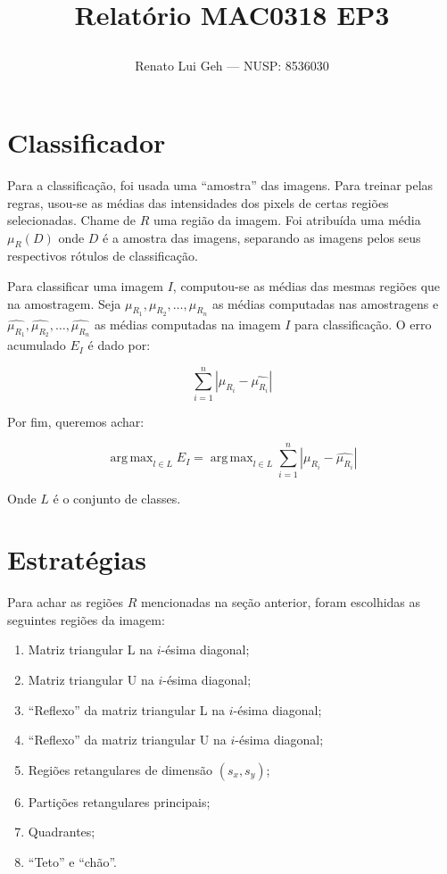 \documentclass[12pt]{article}
\title{%
  Relatório MAC0318 EP3\\
  \author{Renato Lui Geh --- NUSP\@: 8536030}
}
\date{}
\DeclareMathOperator*{\argmax}{arg\,max}
\theoremstyle{plain}
\numberwithin{equation}{section}
\begin{document}
\maketitle

\section{Classificador}

Para a classificação, foi usada uma ``amostra'' das imagens. Para treinar pelas regras, usou-se as
médias das intensidades dos pixels de certas regiões selecionadas. Chame de $R$ uma região da
imagem. Foi atribuída uma média $\mu_R(D)$ onde $D$ é a amostra das imagens, separando as imagens
pelos seus respectivos rótulos de classificação.

Para classificar uma imagem $I$, computou-se as médias das mesmas regiões que na amostragem.
Seja $\mu_{R_1},\mu_{R_2},\ldots,\mu_{R_n}$ as médias computadas nas amostragens e
$\hat{\mu_{R_1}},\hat{\mu_{R_2}},\ldots,\hat{\mu_{R_n}}$ as médias computadas na imagem $I$ para
classificação. O erro acumulado $E_I$ é dado por:

\begin{equation*}
  \sum_{i=1}^n |\mu_{R_i}-\hat{\mu_{R_i}}|
\end{equation*}

Por fim, queremos achar:

\begin{equation*}
  \argmax_{l\in L} E_I = \argmax_{l\in L} \sum_{i=1}^n |\mu_{R_i}-\hat{\mu_{R_i}}|
\end{equation*}

Onde $L$ é o conjunto de classes.

\section{Estratégias}

Para achar as regiões $R$ mencionadas na seção anterior, foram escolhidas as seguintes regiões da
imagem:

\begin{enumerate}
  \item Matriz triangular L na $i$-ésima diagonal;
  \item Matriz triangular U na $i$-ésima diagonal;
  \item ``Reflexo'' da matriz triangular L na $i$-ésima diagonal;
  \item ``Reflexo'' da matriz triangular U na $i$-ésima diagonal;
  \item Regiões retangulares de dimensão $(s_x, s_y)$;
  \item Partições retangulares principais;
  \item Quadrantes;
  \item ``Teto'' e ``chão''.
\end{enumerate}
\end{document}
